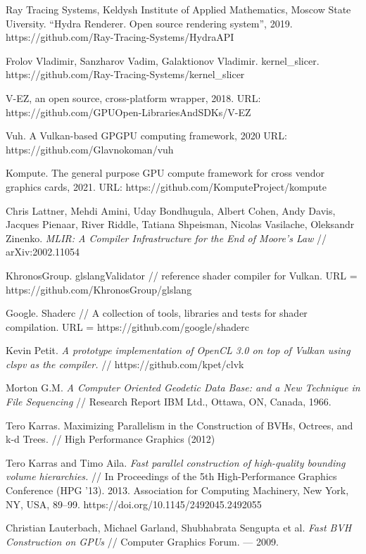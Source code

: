 \documentclass[11pt,fleqn,english,russian]{report} %
\begin{document}
\begin{thebibliography}{10}
	 Ray Tracing Systems, Keldysh Institute of Applied Mathematics, Moscow State Uiversity. ``Hydra Renderer. Open source rendering system'', 2019.
	https://github.com/Ray-Tracing-Systems/HydraAPI
	
	 Frolov Vladimir, Sanzharov Vadim, Galaktionov Vladimir. kernel\_slicer. https://github.com/Ray-Tracing-Systems/kernel\_slicer
	
	 V-EZ, an open source, cross-platform wrapper, 2018. URL: https://github.com/GPUOpen-LibrariesAndSDKs/V-EZ
	
	 Vuh. A Vulkan-based GPGPU computing framework, 2020 URL: https://github.com/Glavnokoman/vuh
	
	 Kompute. The general purpose GPU compute framework for cross vendor graphics cards, 2021. URL: https://github.com/KomputeProject/kompute
	
	 Chris Lattner, Mehdi Amini, Uday Bondhugula, Albert Cohen, Andy Davis, Jacques Pienaar, River Riddle, Tatiana Shpeisman, Nicolas Vasilache, Oleksandr Zinenko. \textit{MLIR: A Compiler Infrastructure for the End of Moore's Law} // arXiv:2002.11054
	
	 KhronosGroup. glslangValidator // reference shader compiler for Vulkan. URL = https://github.com/KhronosGroup/glslang
	
	 Google. Shaderc // A collection of tools, libraries and tests for shader compilation. URL = https://github.com/google/shaderc
	
	 Kevin Petit. \textit{A prototype implementation of OpenCL 3.0 on top of Vulkan using clspv as the compiler.} // https://github.com/kpet/clvk
	
	 Morton G.M. \textit{A Computer Oriented Geodetic Data Base: and a New Technique in File Sequencing} // Research Report IBM Ltd., Ottawa, ON, Canada, 1966.
	
	 Tero Karras. Maximizing Parallelism in the Construction of BVHs, Octrees, and k-d Trees. // High Performance Graphics (2012)
	
	 Tero Karras and Timo Aila. \textit{Fast parallel construction of high-quality bounding volume hierarchies.} // In Proceedings of the 5th High-Performance Graphics Conference (HPG '13). 2013. Association for Computing Machinery, New York, NY, USA, 89–99. https://doi.org/10.1145/2492045.2492055
	
	 Christian Lauterbach, Michael Garland, Shubhabrata Sengupta et al. \textit{Fast BVH Construction on GPUs} // Computer Graphics Forum. — 2009.
	

\end{thebibliography}
\end{document}
